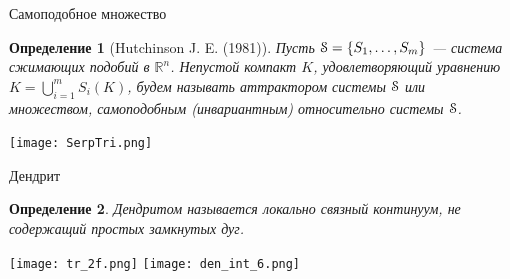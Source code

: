 \documentclass[aspectratio=1610, 10pt, notheorems]{beamer}
\newtheorem{definition}  {Определение}
\begin{document}
\begin{frame}{Самоподобное множество}
    \begin{definition}[Hutchinson J. E. (1981)]
        Пусть ${\EuScript S}=\{S_1, \ldots, S_m\}$ --- система сжимающих подобий в $\mathbb{R}^n$.  
        Непустой компакт $K$, удовлетворяющий уравнению  $K=\bigcup\limits_{i=1}^m S_i(K)$, будем называть {\em аттрактором системы} ${\EuScript S}$ или множеством, самоподобным (инвариантным) относительно системы ${\EuScript S}$.
    \end{definition}
    
    \begin{center}
    \texttt{[image: SerpTri.png]}
    \end{center}
\end{frame}





\begin{frame}{Дендрит}
\begin{definition} 
Дендритом называется локально связный континуум, не содержащий простых замкнутых дуг.
\end{definition}

\texttt{[image: tr\_2f.png]}
\hfill
\texttt{[image: den\_int\_6.png]}

\end{frame}
\end{document}
